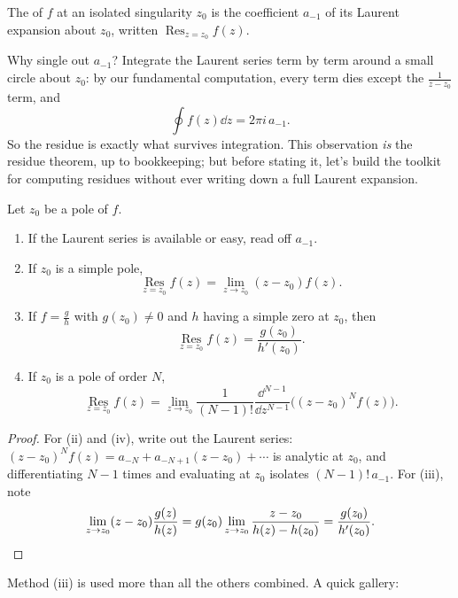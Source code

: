 \documentclass[a4paper]{scrartcl}
\newcommand{\Res}{\operatorname*{Res}}
\begin{document}
\begin{definition}[Residue]
	The  of $f$ at an isolated singularity $z_0$ is the coefficient $a_{-1}$ of its Laurent expansion about $z_0$, written $\Res_{z = z_0} f(z)$.
\end{definition}

Why single out $a_{-1}$? Integrate the Laurent series term by term around a small circle about $z_0$: by our fundamental computation, every term dies except the $\frac{1}{z - z_0}$ term, and
$$
\oint f(z) \dd z = 2\pi i \, a_{-1}.
$$
So the residue is exactly what survives integration. This observation \emph{is} the residue theorem, up to bookkeeping; but before stating it, let's build the toolkit for computing residues without ever writing down a full Laurent expansion.

\begin{proposition}
	Let $z_0$ be a pole of $f$.
	\begin{enumerate}[label=(\roman*)]
		\item If the Laurent series is available or easy, read off $a_{-1}$.
		\item If $z_0$ is a simple pole,
		$$
		\Res_{z = z_0} f(z) = \lim_{z \to z_0} (z - z_0) f(z).
		$$
		\item If $f = \frac{g}{h}$ with $g(z_0) \neq 0$ and $h$ having a simple zero at $z_0$, then
		$$
		\Res_{z = z_0} f(z) = \frac{g(z_0)}{h'(z_0)}.
		$$
		\item If $z_0$ is a pole of order $N$,
		$$
		\Res_{z = z_0} f(z) = \lim_{z \to z_0} \frac{1}{(N-1)!} \frac{\dd^{N - 1}}{\dd z^{N - 1}} \Big( (z - z_0)^N f(z) \Big).
		$$
	\end{enumerate}
\end{proposition}
\begin{proof}
	For (ii) and (iv), write out the Laurent series: $(z - z_0)^N f(z) = a_{-N} + a_{-N + 1}(z - z_0) + \cdots$ is analytic at $z_0$, and differentiating $N - 1$ times and evaluating at $z_0$ isolates $(N-1)! \, a_{-1}$. For (iii), note
	$$
	\lim_{z \to z_0} (z - z_0)\frac{g(z)}{h(z)} = g(z_0) \lim_{z \to z_0} \frac{z - z_0}{h(z) - h(z_0)} = \frac{g(z_0)}{h'(z_0)}. \qedhere
	$$
\end{proof}

Method (iii) is used more than all the others combined. A quick gallery:
\end{document}
